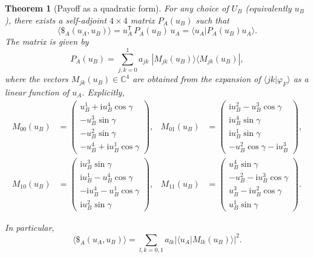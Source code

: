 \documentclass[11pt,a4paper,twoside]{article}
\newcommand{\mi}{\mathrm{i}} %
\newcommand{\scalar}[2]{\langle #1 | #2\rangle} %
\newtheorem{theorem}{Theorem}
\begin{document}
\begin{theorem}[Payoff as a quadratic form]\label{thm:quadratic}
For any choice of \(U_B\) (equivalently \(u_B\)), there exists a self-adjoint \(4\times4\) matrix \(P_A(u_B)\) such that
\[
\langle\$_A(u_A,u_B)\rangle = u_A^{\mathsf T}\,P_A(u_B)\,u_A=\scalar{u_A}{P_A(u_B)u_A}.
\]
The matrix is given by
\[
P_A(u_B)=\sum_{j,k=0}^{1} a_{jk}\; |M_{jk}(u_B)\rangle\langle M_{jk}(u_B)|,
\]
where the vectors \(M_{jk}(u_B)\in\mathbb{C}^4\) are obtained from the expansion of \(\langle jk|\varphi_F\rangle\) as a linear function of \(u_A\).  
Explicitly,
\begin{align*}
M_{00}(u_B)&=\begin{pmatrix}u_B^1+\mi u_B^4\cos\gamma\\ -u_B^3\sin\gamma\\ -u_B^2\sin\gamma\\ -u_B^4+\mi u_B^1\cos\gamma\end{pmatrix},
&
M_{01}(u_B)&=\begin{pmatrix}\mi u_B^2-u_B^3\cos\gamma\\ \mi u_B^4\sin\gamma\\ \mi u_B^1\sin\gamma\\ -u_B^2\cos\gamma-\mi u_B^3\end{pmatrix},\\[6pt]
M_{10}(u_B)&=\begin{pmatrix}\mi u_B^3\sin\gamma\\ \mi u_B^1-u_B^4\cos\gamma\\ -\mi u_B^4-u_B^1\cos\gamma\\ \mi u_B^2\sin\gamma\end{pmatrix},
&
M_{11}(u_B)&=\begin{pmatrix}u_B^4\sin\gamma\\ -u_B^2-\mi u_B^3\cos\gamma\\ u_B^3-\mi u_B^2\cos\gamma\\ u_B^1\sin\gamma\end{pmatrix}.
\end{align*}

In particular, 
\begin{equation}\label{payoff-EWL}
\langle\$_A(u_A,u_B)\rangle=\sum_{l,k=0,1}a_{lk}|\scalar{u_A}{M_{lk}(u_B)}|^2.
\end{equation}

\end{theorem}
\end{document}
